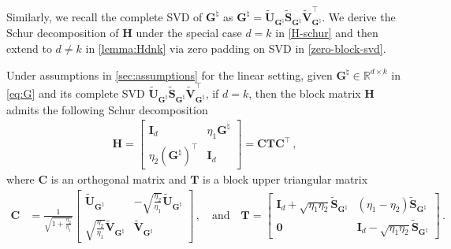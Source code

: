 Similarly, we recall the complete SVD of ${\bm G}^{\natural}$ as ${\bm G}^{\natural} =\widetilde{\bm U}_{\bm G^\natural} \widetilde{\bm S}_{\bm G^\natural} \widetilde{\bm V}_{\bm G^\natural}^{\!\top}$. We derive the Schur decomposition of $\bm H$ under the special case $d=k$ in \cref{H-schur} and then extend to $d\neq k$ in \cref{lemma:Hdnk} via zero padding on SVD in \cref{zero-block-svd}.
\begin{lemma}[Schur Decomposition of $\bm H$ under $d=k$]
\label{H-schur}
    Under assumptions in \cref{sec:assumptions} for the linear setting, given ${\bm G}^{\natural}\in\mathbb{R}^{d\times k}$ in \cref{eq:G} and its complete SVD $\widetilde{\bm U}_{\bm G^\natural}\widetilde{\bm S}_{\bm G^\natural}\widetilde{\bm V}_{\bm G^\natural}^{\!\top}$, if $d=k$, then the block matrix $\bm H$ admits the following Schur decomposition
    \begin{align*}
        \bm H = 
        \begin{bmatrix}
            \bm I_d & \eta_1 {\bm G}^{\natural}\\
            \eta_2 \left({\bm G}^{\natural}\right)^{\!\top} & \bm I_d
        \end{bmatrix} = \mathbf{C}\mathbf{T}\mathbf{C}^{\!\top}\,,
    \end{align*}
    where $\bm C$ is an orthogonal matrix and $\bm T$ is a block upper triangular matrix
    \begin{align*}
        \mathbf{C} & = \frac{1}{\sqrt{1+\frac{\eta_2}{\eta_1}}}\begin{bmatrix}
        \widetilde{\bm U}_{\bm G^\natural} & -\sqrt{\frac{\eta_2}{\eta_1}}\widetilde{\bm U}_{\bm G^\natural}\\
        \sqrt{\frac{\eta_2}{\eta_1}}\widetilde{\bm V}_{\bm G^\natural} & \widetilde{\bm V}_{\bm G^\natural}
    \end{bmatrix}\,,
   \quad \mbox{and} \quad
        \mathbf{T} = \begin{bmatrix}
        \bm I_d+\sqrt{\eta_1\eta_2}\widetilde{\bm S}_{\bm G^\natural} & (\eta_1 - \eta_2)\widetilde{\bm S}_{\bm G^\natural} \\
        \bm 0 & \bm I_d-\sqrt{\eta_1\eta_2}\widetilde{\bm S}_{\bm G^\natural}
        \end{bmatrix}\,.
    \end{align*}
\end{lemma}
